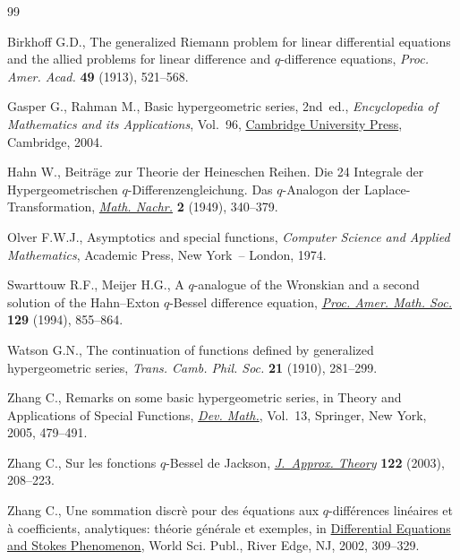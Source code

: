 \documentclass[pdftex]{sigma}
\begin{document}
\begin{thebibliography}{99}

\footnotesize\itemsep=0pt

Birkhof\/f G.D.,
The generalized Riemann problem for linear dif\/ferential equations and the allied problems for linear dif\/ference and $q$-dif\/ference equations,
{\it  Proc. Amer. Acad.} \textbf{49} (1913), 521--568.

Gasper G.,  Rahman M.,
Basic hypergeometric series, 2nd~ed.,
{\it Encyclopedia of Mathematics and its Applications}, Vol.~96, \href{http://dx.doi.org/10.1017/CBO9780511526251}{Cambridge University Press}, Cambridge, 2004.

Hahn W.,
Beitr\"age zur Theorie der Heineschen Reihen. Die 24 Integrale der Hypergeometrischen $q$-Dif\/ferenzengleichung.
Das $q$-Analogon der Laplace-Transformation,
\href{http://dx.doi.org/10.1002/mana.19490020604}{{\it Math. Nachr.}} {\bf 2} (1949), 340--379.

Olver F.W.J.,
Asymptotics and special functions,
{\it Computer Science and Applied Mathematics},  Academic Press, New York~-- London, 1974.

Swarttouw R.F., Meijer H.G.,
A $q$-analogue of the Wronskian and a second solution of the Hahn--Exton $q$-Bessel dif\/ference equation,
\href{http://dx.doi.org/10.2307/2160480}{{\it Proc. Amer. Math. Soc.}} \textbf{129} (1994),   855--864.

Watson G.N.,
The continuation of functions def\/ined by generalized hypergeometric series,
{\it Trans. Camb. Phil. Soc.} {\bf 21} (1910),  281--299.

Zhang C.,
Remarks on some basic hypergeometric series,
in Theory and Applications of Special Functions,
\href{http://dx.doi.org/10.1007/0-387-24233-3_22}{{\it Dev. Math.}}, Vol.~13, Springer, New York, 2005, 479--491.

Zhang C.,
Sur les fonctions $q$-Bessel de Jackson,
\href{http://dx.doi.org/10.1016/S0021-9045(03)00073-X}{{\it J.~Approx. Theory}} {\bf 122}  (2003),  208--223.

Zhang C.,
Une sommation discr\`e pour des \'equations aux $q$-dif\/f\'erences lin\'eaires et \`a  coef\/f\/icients, analytiques: th\'eorie g\'en\'erale et exemples,
in \href{http://dx.doi.org/10.1142/9789812776549_0012}{Dif\/ferential Equations and Stokes Phenomenon}, World Sci. Publ., River Edge, NJ, 2002, 309--329.

\end{thebibliography}\LastPageEnding
\end{document}

